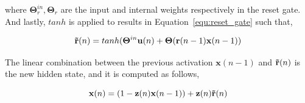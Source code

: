 \documentclass{WitsPhysicsReport}
\begin{document}
where $\mathbf{\Theta}^{in}_{r} , \mathbf{\Theta}_{r}$ are the input and internal weights respectively in the reset gate.  And lastly, $tanh$ is applied to results in Equation~\ref{equ:reset_gate} such that,


\begin{equation}
\mathbf{\Tilde{r}}(n) = tanh (\mathbf{\Theta}^{in} \mathbf{u}(n) + \mathbf{\Theta} ( \mathbf{r}(n-1) \mathbf{x}(n-1)   )
\label{equ:reset_gate2}
\end{equation}

The linear combination between the previous activation $\mathbf{x}(n-1)$  and $\mathbf{\Tilde{r}}(n)$ is the new hidden state, and it is computed as follows, 

\begin{equation}
\mathbf{x}(n) = (1-\mathbf{z}(n)\mathbf{x}(n-1)) + \mathbf{z}(n)\mathbf{\Tilde{r}}(n) 
\label{equ:gru_final_activation}
\end{equation}
\end{document}
